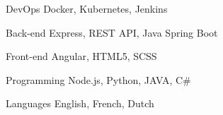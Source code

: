 

\begin{cvskills}

  \cvskill
    {DevOps} %
    {Docker, Kubernetes, Jenkins} %

  \cvskill
    {Back-end} %
    {Express, REST API, Java Spring Boot} %

  \cvskill
    {Front-end} %
    {Angular, HTML5, SCSS} %

  \cvskill
    {Programming} %
    {Node.js, Python, JAVA, C#} %

  \cvskill
    {Languages} %
    {English, French, Dutch} %

\end{cvskills}
